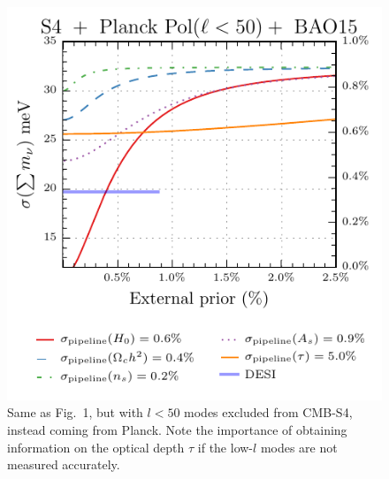 \documentclass[aps,prd,reprint,superscriptaddress,nofootinbib,floatfix]{revtex4-1}
\begin{document}
\begin{figure}[htbp]
\begin{center}
\includegraphics{prior_omnuh2_l50}
\caption{Same as Fig.~1, but with $l<50$ modes excluded from CMB-S4, instead coming from Planck. Note the importance of obtaining information on the optical depth $\tau$ if the low-$l$ modes are not measured accurately.}
\label{fig:prior-50}
\end{center}
\end{figure}



\end{document}
